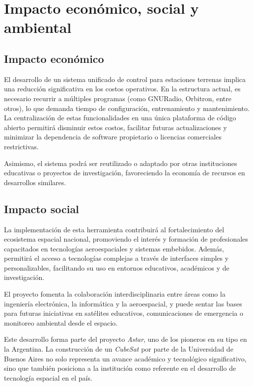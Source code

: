 \section*{Impacto económico, social y ambiental}

\subsection*{Impacto económico}

El desarrollo de un sistema unificado de control para estaciones terrenas implica una reducción significativa en los costos operativos. En la estructura actual, es necesario recurrir a múltiples programas (como GNURadio, Orbitron, entre otros), lo que demanda tiempo de configuración, entrenamiento y mantenimiento. La centralización de estas funcionalidades en una única plataforma de código abierto permitirá disminuir estos costos, facilitar futuras actualizaciones y minimizar la dependencia de software propietario o licencias comerciales restrictivas.

Asimismo, el sistema podrá ser reutilizado o adaptado por otras instituciones educativas o proyectos de investigación, favoreciendo la economía de recursos en desarrollos similares.

\subsection*{Impacto social}

La implementación de esta herramienta contribuirá al fortalecimiento del ecosistema espacial nacional, promoviendo el interés y formación de profesionales capacitados en tecnologías aeroespaciales y sistemas embebidos. Además, permitirá el acceso a tecnologías complejas a través de interfaces simples y personalizables, facilitando su uso en entornos educativos, académicos y de investigación.

El proyecto fomenta la colaboración interdisciplinaria entre áreas como la ingeniería electrónica, la informática y la aeroespacial, y puede sentar las bases para futuras iniciativas en satélites educativos, comunicaciones de emergencia o monitoreo ambiental desde el espacio.

Este desarrollo forma parte del proyecto \textit{Astar}, uno de los pioneros en su tipo en la Argentina. La construcción de un \textit{CubeSat} por parte de la Universidad de Buenos Aires no solo representa un avance académico y tecnológico significativo, sino que también posiciona a la institución como referente en el desarrollo de tecnología espacial en el país.

